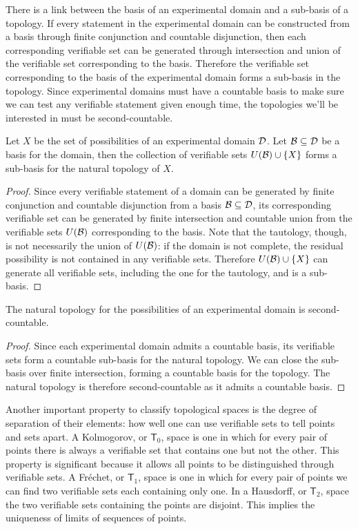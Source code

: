 \documentclass[11pt,letterpaper,fleqn]{memoir} %
\begin{document}
There is a link between the basis of an experimental domain and a sub-basis of a topology. If every statement in the experimental domain can be constructed from a basis through finite conjunction and countable disjunction, then each corresponding verifiable set can be generated through intersection and union of the verifiable set corresponding to the basis. Therefore the verifiable set corresponding to the basis of the experimental domain forms a sub-basis in the topology. Since experimental domains must have a countable basis to make sure we can test any verifiable statement given enough time, the topologies we'll be interested in must be second-countable.

\begin{mathSection}
	\begin{prop}
		Let $X$ be the set of possibilities of an experimental domain $\mathcal{D}$. Let $\mathcal{B} \subseteq \mathcal{D}$ be a basis for the domain, then the collection of verifiable sets $U(\mathcal{B})\cup\{X\}$ forms a sub-basis for the natural topology of $X$.
	\end{prop}
	\begin{proof}
		Since every verifiable statement of a domain can be generated by finite conjunction and countable disjunction from a basis $\mathcal{B} \subseteq \mathcal{D}$, its corresponding verifiable set can be generated by finite intersection and countable union from the verifiable sets $U(\mathcal{B})$ corresponding to the basis. Note that the tautology, though, is not necessarily the union of $U(\mathcal{B})$: if the domain is not complete, the residual possibility is not contained in any verifiable sets. Therefore $U(\mathcal{B})\cup\{X\}$ can generate all verifiable sets, including the one for the tautology, and is a sub-basis.
	\end{proof}
	\begin{prop}
		The natural topology for the possibilities of an experimental domain is second-countable.
	\end{prop}
	\begin{proof}
		Since each experimental domain admits a countable basis, its verifiable sets form a countable sub-basis for the natural topology. We can close the sub-basis over finite intersection, forming a countable basis for the topology. The natural topology is therefore second-countable as it admits a countable basis.
\end{proof}
\end{mathSection}

Another important property to classify topological spaces is the degree of separation of their elements: how well one can use verifiable sets to tell points and sets apart. A Kolmogorov, or $\mathsf{T}_0$, space is one in which for every pair of points there is always a verifiable set that contains one but not the other. This property is significant because it allows all points to be distinguished through verifiable sets. A Fr\'echet, or $\mathsf{T}_1$, space is one in which for every pair of points we can find two verifiable sets each containing only one. In a Hausdorff, or $\mathsf{T}_2$, space the two verifiable sets containing the points are disjoint. This implies the uniqueness of limits of sequences of points.
\end{document}
